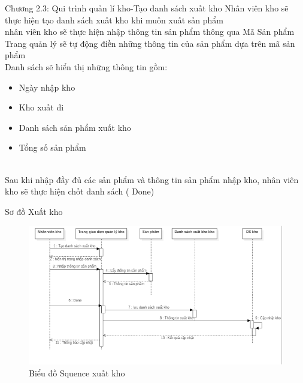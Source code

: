 \documentclass{beamer}
\begin{document}
\begin{frame}{Chương 2.3: Qui trình quản lí kho-Tạo danh sách xuất kho}
    Nhân viên kho sẽ thực hiện tạo danh sách xuất kho khi muốn xuất sản phẩm\\
    nhân viên kho sẽ thực hiện nhập thông tin sản phẩm thông qua  Mã Sản phẩm\\
    Trang quản lý sẽ tự động điền những thông tin của sản phẩm dựa trên mã sản phẩm\\
    Danh sách sẽ hiển thị những thông tin gồm: 
        \begin{itemize}
            \item Ngày nhập kho
            \item Kho xuất đi
            \item Danh sách sản phẩm xuất kho
            \item Tổng số sản phẩm
        \end{itemize}\\
    Sau khi nhập đầy đủ các sản phẩm và thông tin sản phẩm nhập kho, nhân viên kho sẽ thực hiện chốt danh sách ( Done)
\end{frame}

\begin{frame}{Sơ đồ Xuất kho}
    \begin{figure}
        \centering
        \includegraphics[scale = 0.5]{20.png}
        \caption{Biểu đồ Squence xuất kho}
    \end{figure}
\end{frame}
\end{document}
